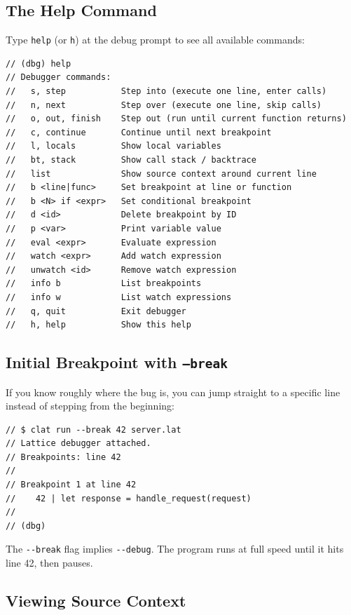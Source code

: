 \subsection{The Help Command}\label{sec:debug-help}

Type \lstinline|help| (or \lstinline|h|) at the debug prompt to see all available commands:

\begin{lstlisting}[language=Lattice, caption={Debugger help output}]
// (dbg) help
// Debugger commands:
//   s, step           Step into (execute one line, enter calls)
//   n, next           Step over (execute one line, skip calls)
//   o, out, finish    Step out (run until current function returns)
//   c, continue       Continue until next breakpoint
//   l, locals         Show local variables
//   bt, stack         Show call stack / backtrace
//   list              Show source context around current line
//   b <line|func>     Set breakpoint at line or function
//   b <N> if <expr>   Set conditional breakpoint
//   d <id>            Delete breakpoint by ID
//   p <var>           Print variable value
//   eval <expr>       Evaluate expression
//   watch <expr>      Add watch expression
//   unwatch <id>      Remove watch expression
//   info b            List breakpoints
//   info w            List watch expressions
//   q, quit           Exit debugger
//   h, help           Show this help
\end{lstlisting}

\subsection{Initial Breakpoint with \texttt{--break}}\label{sec:break-line-flag}

If you know roughly where the bug is, you can jump straight to a specific line instead of stepping from the beginning:

\begin{lstlisting}[language=Lattice, caption={Starting with a breakpoint}]
// $ clat run --break 42 server.lat
// Lattice debugger attached.
// Breakpoints: line 42
//
// Breakpoint 1 at line 42
//    42 | let response = handle_request(request)
//
// (dbg)
\end{lstlisting}

The \lstinline|--break| flag implies \lstinline|--debug|.
The program runs at full speed until it hits line 42, then pauses.

\subsection{Viewing Source Context}\label{sec:debug-list}

